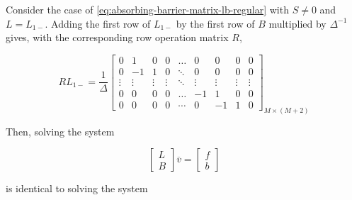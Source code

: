 \documentclass[11pt]{article}
\theoremstyle{definition}
\begin{document}
Consider the case of \cref{eq:absorbing-barrier-matrix-lb-regular} with $S\neq 0$ and $L = L_{1-}$. Adding the first row of $L_{1-}$ by the first row of $B$ multiplied by $\Delta^{-1}$ gives, with the corresponding row operation matrix $R$, 

\begin{equation}
RL_{1-} = \frac{1}{\Delta}\begin{bmatrix}
0&1&0&0&\dots&0&0&0&0\\
0&-1&1&0&\ddots&0&0&0&0\\
\vdots&\vdots&\vdots&\vdots&\ddots&\vdots&\vdots&\vdots&\vdots\\
0&0&0&0&\dots&-1&1&0&0\\
0&0&0&0&\cdots&0&-1&1&0
\end{bmatrix}_{M\times (M+2)}
\end{equation}


Then, solving the system 

\begin{equation}
\begin{bmatrix}
 L \\
 B
\end{bmatrix} 
\overline{v}
=
\begin{bmatrix}
f \\
b
\end{bmatrix}
\end{equation}

is identical to solving the system
\end{document}
